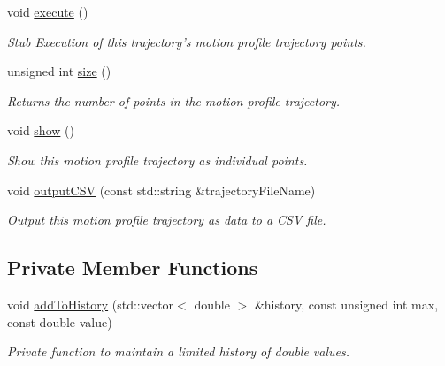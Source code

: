 \begin{DoxyCompactItemize}
void \hyperlink{classTrajectory_a54a11d19ae655d4db78ecd59d0d5a131}{execute} ()
\begin{DoxyCompactList}\small\item\em Stub Execution of this trajectory's motion profile trajectory points. \end{DoxyCompactList}\item 
unsigned int \hyperlink{classTrajectory_a93083e57d71d95670b957aa31aacab25}{size} ()
\begin{DoxyCompactList}\small\item\em Returns the number of points in the motion profile trajectory. \end{DoxyCompactList}\item 
void \hyperlink{classTrajectory_aaedb75c528c178cee1023a74f2caa077}{show} ()
\begin{DoxyCompactList}\small\item\em Show this motion profile trajectory as individual points. \end{DoxyCompactList}\item 
void \hyperlink{classTrajectory_a78f10564618041f74666a5dbb735e4cb}{output\-C\-S\-V} (const std\-::string \&trajectory\-File\-Name)
\begin{DoxyCompactList}\small\item\em Output this motion profile trajectory as data to a C\-S\-V file. \end{DoxyCompactList}\end{DoxyCompactItemize}
\subsection*{Private Member Functions}
\begin{DoxyCompactItemize}
\item 
void \hyperlink{classTrajectory_a76e24db532647bd0d5e3ba1e004d85ee}{add\-To\-History} (std\-::vector$<$ double $>$ \&history, const unsigned int max, const double value)
\begin{DoxyCompactList}\small\item\em Private function to maintain a limited history of double values. \end{DoxyCompactList}\end{DoxyCompactItemize}
